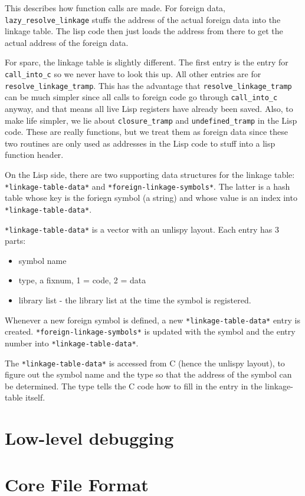 This describes how function calls are made. For foreign data,
\verb|lazy_resolve_linkage| stuffs the address of the actual foreign
data into the linkage table. The lisp code then just loads the address
from there to get the actual address of the foreign data.

For sparc, the linkage table is slightly different. The first entry is
the entry for \verb|call_into_c| so we never have to look this up. All
other entries are for \verb|resolve_linkage_tramp|. This has the
advantage that \verb|resolve_linkage_tramp| can be much simpler since
all calls to foreign code go through \verb|call_into_c| anyway, and
that means all live Lisp registers have already been saved. Also, to
make life simpler, we lie about \verb|closure_tramp| and
\verb|undefined_tramp| in the Lisp code. These are really functions,
but we treat them as foreign data since these two routines are only
used as addresses in the Lisp code to stuff into a lisp function
header.

On the Lisp side, there are two supporting data structures for the
linkage table: \verb|*linkage-table-data*| and
\verb|*foreign-linkage-symbols*|. The latter is a hash table whose key
is the foriegn symbol (a string) and whose value is an index into
\verb|*linkage-table-data*|.

\verb|*linkage-table-data*| is a vector with an unlispy layout. Each
entry has 3 parts:

\begin{itemize}
\item symbol name
\item type, a fixnum, 1 = code, 2 = data
\item library list - the library list at the time the symbol is registered.
\end{itemize}

Whenever a new foreign symbol is defined, a new
\verb|*linkage-table-data*| entry is created.
\verb|*foreign-linkage-symbols*| is updated with the symbol and the
entry number into \verb|*linkage-table-data*|.

The \verb|*linkage-table-data*| is accessed from C (hence the unlispy
layout), to figure out the symbol name and the type so that the
address of the symbol can be determined.  The type tells the C code
how to fill in the entry in the linkage-table itself.



\chapter{Low-level debugging}

\chapter{Core File Format}
